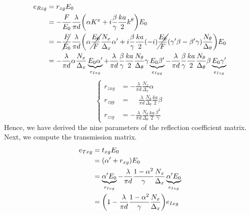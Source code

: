\begin{align*}
    e_{\R zg} &= r_{zg} E_0
    \\
    &=
    -
    \frac{F}{E_0}
    \frac{\lambda}{\pi d}
    \left(
        \alpha K^x
        +
        i
        \frac{\beta}{\gamma}
        \frac{ka}{2}
        k^\theta
    \right)
    E_0
    \\
    &=
    -
    \cancel{\frac{F}{E_0}}
    \frac{\lambda}{\pi d}
    \left(
        \alpha
        \cancel{\frac{E_0}{F}}
        \frac{N_x}{\Delta_x}
        \alpha'
        +
        i
        \frac{\beta}{\gamma}
        \frac{ka}{2}
        (-i)
        \cancel{\frac{E_0}{F}}
        (\gamma' \beta - \beta' \gamma)
        \frac{N_\theta}{\Delta_\theta}
    \right)
    E_0
    \\
    &=
    -
    \frac{\lambda}{\pi d}
    \alpha
    \frac{N_x}{\Delta_x}
    \underbrace{E_0 \alpha'}_{e_{\I xg}}
    +
    \frac{\lambda}{\pi d}
    \frac{\beta}{\gamma}
    \frac{ka}{2}
    \frac{N_\theta}{\Delta_\theta}
    \gamma
    \underbrace{E_0 \beta'}_{e_{\I yg}}
    -
    \frac{\lambda}{\pi d}
    \frac{\beta}{\gamma}
    \frac{ka}{2}
    \frac{N_\theta}{\Delta_\theta}
    \beta
    \underbrace{E_0 \gamma'}_{e_{\I zg}}
\end{align*}
\begin{equation}
    \left\lbrace
    \begin{aligned}
        r_{zxg}
        &=
        -
        \frac{\lambda}{\pi d}
        \frac{N_x}{\Delta_x}
        \alpha
        \\
        r_{zyg}
        &=
        \phantom{-}
        \frac{\lambda}{\pi d}
        \frac{N_\theta}{\Delta_\theta}
        \frac{ka}{2}
        \beta
        \\
        r_{zzg}
        &=
        -
        \frac{\lambda}{\pi d}
        \frac{N_\theta}{\Delta_\theta}
        \frac{ka}{2}
        \frac{\beta^2}{\gamma}
    \end{aligned}
    \right.
\end{equation}
Hence, we have derived the nine parameters of the reflection coefficient matrix.
Next, we compute the transmission matrix.
\begin{align*}
    e_{\T xg} &= t_{xg} E_0
    \\
    &= (\alpha' + r_{xg}) E_0
    \\
    &= \underbrace{\alpha' E_0}_{e_{\I xg}}
       -
       \frac{\lambda}{\pi d}
       \frac{1 - \alpha^2}{\gamma}
       \frac{N_x}{\Delta_x}
       \underbrace{\alpha' E_0}_{e_{\I xg}}
    \\
    &= \left(
           1
           -
           \frac{\lambda}{\pi d}
           \frac{1 - \alpha^2}{\gamma}
           \frac{N_x}{\Delta_x}
       \right)
       e_{\I xg}
\end{align*}
